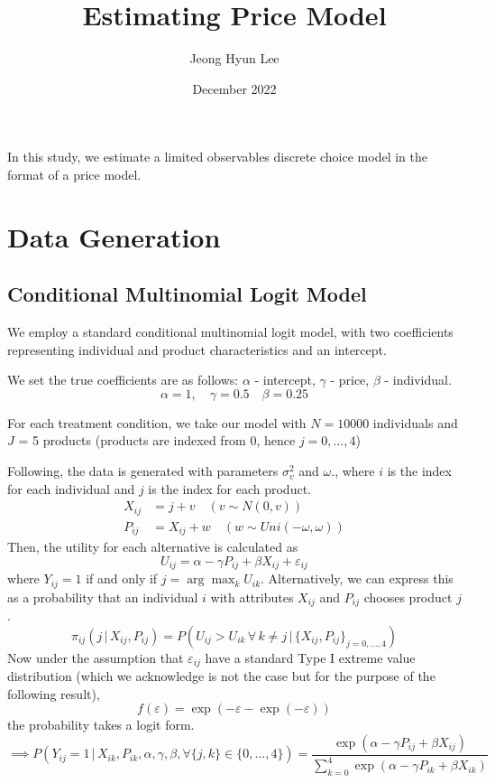 \documentclass[12pt]{article}
\title{Estimating Price Model}
\author{Jeong Hyun Lee}
\date{December 2022}
\begin{document}
\maketitle

In this study, we estimate a limited observables discrete choice model in the format of a price model.
\tableofcontents
\newpage
\section{Data Generation}
\subsection{Conditional Multinomial Logit Model}
We employ a standard conditional multinomial logit model, with two coefficients representing individual and product characteristics and an intercept.

We set the true coefficients are as follows: \(\alpha\) - intercept, \(\gamma\) - price, \(\beta\) - individual.
\[\alpha = 1,\quad\gamma = 0.5\quad\beta = 0.25\]

For each treatment condition, we take our model with \(N=10000\) individuals and \(J\) = 5 products (products are indexed from 0, hence \(j=0,...,4\))

Following, the data is generated with parameters \(\sigma^2_v\) and \(\omega\)., where \(i\) is the index for each individual and \(j\) is the index for each product.
\[\begin{split}
X_{ij} &= j + v\quad(v\sim N(0,v))\\
P_{ij} &= X_{ij} + w\quad(w\sim Uni(-\omega,\omega))
\end{split}\]
Then, the utility for each alternative is calculated as
\[U_{ij}=\alpha-\gamma P_{ij}+\beta X_{ij}+\varepsilon_{ij}\]
where \(Y_{ij}=1\) if and only if \(j=\arg\max_{k}U_{ik}\). Alternatively, we can express this as a probability that an individual \(i\) with attributes \(X_{ij}\) and \(P_{ij}\) chooses product \(j\).
\[\pi_{ij}(j\,|\,X_{ij},P_{ij})=P(U_{ij}>U_{ik}\,\forall\,k\neq j\,|\,\{X_{ij},P_{ij}\}_{j=0,\dots,4})\]
Now under the assumption that \(\varepsilon_{ij}\) have a standard Type I extreme value distribution (which we acknowledge is not the case but for the purpose of the following result), 
\[f(\varepsilon)=\exp{(-\varepsilon-\exp{(-\varepsilon)})}\]
the probability takes a logit form.
\[\implies P(Y_{ij}=1\,|\,X_{ik},P_{ik},\alpha,\gamma,\beta,\forall \{j,k\}\in\{0,\dots,4\})=\frac{\exp{(\alpha-\gamma P_{ij}+\beta X_{ij})}}{\sum_{k=0}^4\exp{(\alpha-\gamma P_{ik}+\beta X_{ik})}}\]
\end{document}
